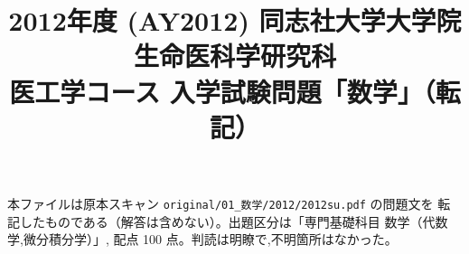 \documentclass[11pt,a4paper]{article}
\title{2012年度 (AY2012) 同志社大学大学院 生命医科学研究科\\
医工学コース 入学試験問題「数学」（転記）}
\author{}
\date{}
\begin{document}
\maketitle
\vspace{-3em}

\begin{rem}
本ファイルは原本スキャン \texttt{original/01\_数学/2012/2012su.pdf} の問題文を
転記したものである（解答は含めない）。出題区分は「専門基礎科目 数学（代数学,微分積分学）」,
配点 100 点。判読は明瞭で,不明箇所はなかった。
\end{rem}

\bigskip

\bigskip

\bigskip

\bigskip

\bigskip

\bigskip

\end{document}
